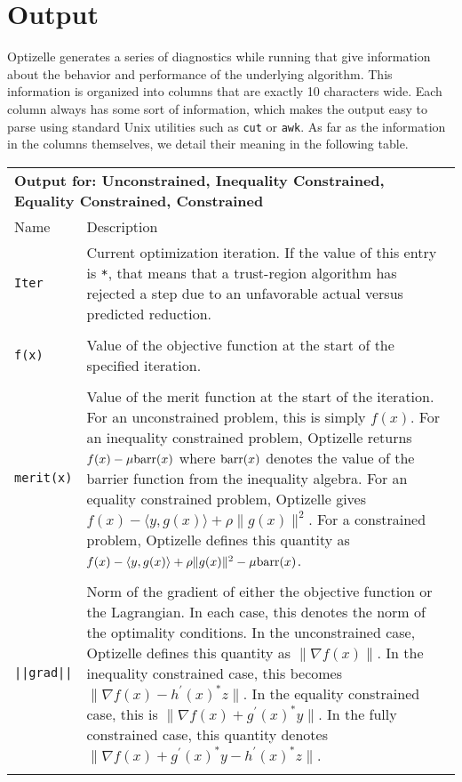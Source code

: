 \documentclass{report}
\newcommand{\ineqGradLag}[2]{\nabla f(#1)-h^\prime(#1)^*#2}
\newcommand{\eqGradLag}[2]{\nabla f(#1)+g^\prime(#1)^*#2}
\newcommand{\conGradLag}[3]{\nabla f(#1)+g^\prime(#1)^*#2-h^\prime(#1)^*#3}
\begin{document}
\chapter{Output}\label{ch:Output}

        Optizelle generates a series of diagnostics while running that give information about the behavior and performance of the underlying algorithm.  This information is organized into columns that are exactly 10 characters wide.  Each column always has some sort of information, which makes the output easy to parse using standard Unix utilities such as \texttt{cut} or \texttt{awk}.  As far as the information in the columns themselves, we detail their meaning in the following table.

\begin{longtable}{lp{}}
\multicolumn{2}{p{\textwidth}}{\bf Output for: Unconstrained, Inequality Constrained, Equality Constrained, Constrained}\\
Name & Description\\
\texttt{Iter} & Current optimization iteration.  If the value of this entry is \texttt{*}, that means that a trust-region algorithm has rejected a step due to an unfavorable actual versus predicted reduction. \\
\\
\texttt{f(x)} & Value of the objective function at the start of the specified iteration.\\
\\
\texttt{merit(x)} & Value of the merit function at the start of the iteration.  For an unconstrained problem, this is simply $f(x)$.  For an inequality constrained problem, Optizelle returns $f(x)-\mu \textnormal{barr}(x)$ where $\textnormal{barr}(x)$ denotes the value of the barrier function from the inequality algebra.  For an equality constrained problem, Optizelle gives $f(x)-\langle y, g(x)\rangle + \rho \|g(x)\|^2$.  For a constrained problem, Optizelle defines this quantity as $f(x)-\langle y, g(x)\rangle + \rho \|g(x)\|^2 - \mu\textnormal{barr}(x)$.\\
\\
\texttt{||grad||} & Norm of the gradient of either the objective function or the Lagrangian.  In each case, this denotes the norm of the optimality conditions.  In the unconstrained case, Optizelle defines this quantity as $\|\nabla f(x)\|$.  In the inequality constrained case, this becomes $\|\ineqGradLag{x}{z}\|$.  In the equality constrained case, this is $\|\eqGradLag{x}{y}\|$.  In the fully constrained case, this quantity denotes $\|\conGradLag{x}{y}{z}\|$.\\\\

\end{longtable}
\end{document}
